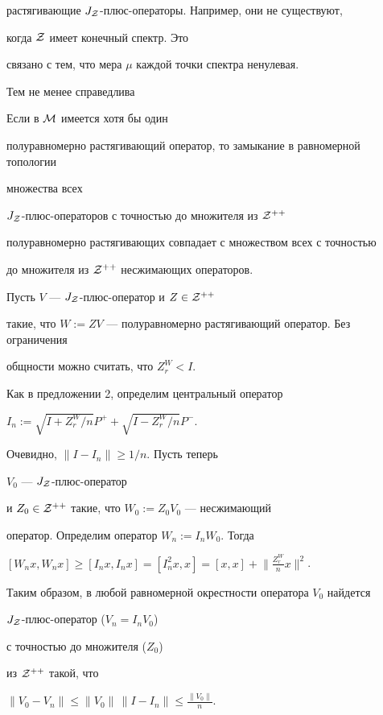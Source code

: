 растягивающие $J_{\cal Z}$-плюс-операторы. Например, они не существуют,


когда ${\cal Z}$ имеет конечный спектр. Это


связано с тем, что мера $\mu$ каждой точки спектра ненулевая. 


Тем не менее справедлива





\begin{thm}


Если в $\cal M$ имеется хотя бы один


полуравномерно растягивающий оператор, то замыкание в равномерной топологии


множества всех


$J_{\cal Z}$-плюс-операторов с точностью до множителя из ${\cal Z}^{++}$


полуравномерно растягивающих совпадает с множеством всех с точностью


до множителя из ${\cal Z}^{++}$ несжимающих операторов.


\end{thm}





\begin{pf}


Пусть $V$ --- $J_{\cal Z}$-плюс-оператор и $Z\in {\cal Z}^{++}$


такие, что $W:=ZV$ --- полуравномерно растягивающий оператор. Без ограничения


общности можно считать, что $Z_{r}^{W}<I$. 


Как в предложении 2, определим центральный оператор


$I_{n}:=\sqrt{I+Z_{r}^{W}/n}P^{+}+\sqrt{I-Z_{r}^{W}/n}P^{-}$.


Очевидно, $\| I-I_{n}\|\geq 1/n$. Пусть теперь


$V_{0}$ --- $J_{\cal Z}$-плюс-оператор


и $Z_{0}\in {\cal Z}^{++}$ такие, что $W_{0}:=Z_{0}V_{0}$ --- несжимающий


оператор. Определим оператор $W_{n}:=I_{n}W_{0}$. Тогда


$[W_{n}x,W_{n}x]\geq [I_{n}x,I_{n}x]=[I_{n}^{2}x,x]=[x,x]+


\big\| \frac{Z^{W}_{r}}{n}x\big\|^{2}$.


Таким образом, в любой равномерной окрестности оператора $V_{0}$ найдется


$J_{\cal Z}$-плюс-оператор ($V_{n}=I_{n}V_{0}$)


с точностью до множителя ($Z_{0}$)


из ${\cal Z}^{++}$ такой, что


$\| V_{0}-V_{n}\|\leq\| V_{0}\|\,\| I-I_{n}\|\leq \frac{\| V_{0}\|}{n}$.


\end{pf}









